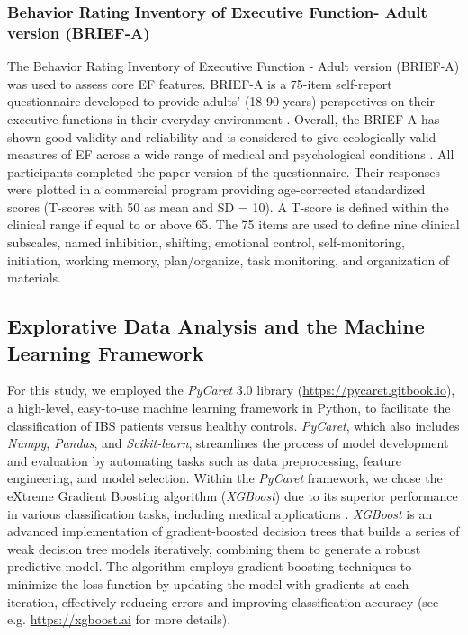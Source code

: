 \documentclass[jcm,article,submit,pdftex,moreauthors]{Definitions/mdpi}
\begin{document}
\subsubsection{Behavior Rating Inventory of Executive Function- Adult version (BRIEF-A)} 
The Behavior Rating Inventory of Executive Function - Adult version (BRIEF-A) was used to assess core EF features. BRIEF-A is a 75-item self-report questionnaire developed to provide adults’ (18-90 years) perspectives on their executive functions in their everyday environment \cite{roth2005manual}. Overall, the BRIEF-A has shown good validity and reliability and is considered to give ecologically valid measures of EF across a wide range of medical and psychological conditions \cite{roth2013confirmatory}. All participants completed the paper version of the questionnaire. Their responses were plotted in a commercial program providing age-corrected standardized scores (T-scores with 50 as mean and SD = 10). A T-score is defined within the clinical range if equal to or above 65. The 75 items are used to define nine clinical subscales, named inhibition, shifting, emotional control, self-monitoring, initiation, working memory, plan/organize, task monitoring, and organization of materials. 



\subsection{Explorative Data Analysis and the Machine Learning Framework}

For this study, we employed the \textit{PyCaret} 3.0 library ({\small \url{https://pycaret.gitbook.io}}), a high-level, easy-to-use machine learning framework in Python, to facilitate the classification of IBS patients versus healthy controls. \textit{PyCaret}, which also includes \textit{Numpy}, \textit{Pandas}, and \textit{Scikit-learn}, streamlines the process of model development and evaluation by automating tasks such as data preprocessing, feature engineering, and model selection. Within the \textit{PyCaret} framework, we chose the eXtreme Gradient Boosting algorithm (\textit{XGBoost}) 
due to its superior performance in various classification tasks, including medical applications \cite{chen2016}. \textit{XGBoost} is an advanced implementation of gradient-boosted decision trees that builds a series of weak decision tree models iteratively, combining them to generate a robust predictive model. The algorithm employs gradient boosting techniques to minimize the loss function by updating the model with gradients at each iteration, effectively reducing errors and improving classification accuracy (see e.g. {\small \url{https://xgboost.ai}} for more details).
\end{document}
